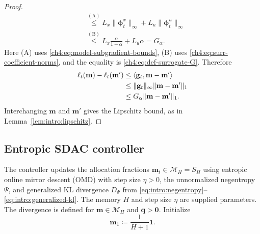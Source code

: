 \begin{proof}
\[\begin{aligned}
&\overset{\mathrm{(A)}}{\le}
 L_x\|\boldsymbol\phi_t^x\|_\infty+L_u\|\boldsymbol\phi_t^u\|_\infty\\
&\overset{\mathrm{(B)}}{\le}L_x\frac{\alpha}{1-\alpha}+L_u\alpha
 =G_\alpha.
\end{aligned}
\]
Here (A) uses \eqref{ch4:eq:model-subgradient-bounds}, (B) uses
\eqref{ch4:eq:surr-coefficient-norms}, and the equality is
\eqref{ch4:eq:def-surrogate-G}. Therefore
\[
\begin{aligned}
\ell_t(\mathbf m)-\ell_t(\mathbf m')
&\le\left\langle \mathbf g_t,\mathbf m-\mathbf m' \right\rangle\\
&\le\|\mathbf g_t\|_\infty\|\mathbf m-\mathbf m'\|_1\\
&\le G_\alpha\|\mathbf m-\mathbf m'\|_1.
\end{aligned}
\]
Interchanging $\mathbf m$ and $\mathbf m'$ gives the Lipschitz bound,
as in Lemma~\ref{lem:intro:lipschitz}.
\end{proof}

\subsection{Entropic SDAC controller}
\label{ch4:sec:online-algorithm}

The controller updates the allocation fractions
$\mathbf m_t\in\mathcal M_H=S_H$ using entropic online mirror descent (OMD)
\cite{BECK2003167} with step size $\eta>0$, the unnormalized negentropy
$\Psi$, and generalized KL divergence $D_\Psi$ from
\eqref{eq:intro:negentropy}--\eqref{eq:intro:generalized-kl}.
The memory $H$ and step size $\eta$ are supplied parameters.
The divergence is defined for $\mathbf m\in\mathcal M_H$ and
$\mathbf q>\mathbf0$. Initialize
\begin{equation}
\label{ch4:eq:alg-init}
\mathbf{m}_1\coloneqq\frac{1}{H+1}\mathbf{1}.
\end{equation}

